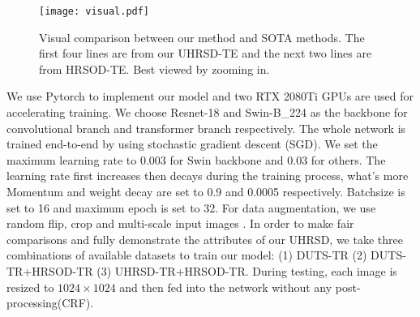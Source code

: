 \documentclass[10pt,twocolumn,letterpaper]{article}
\begin{document}
\begin{figure*}[t]
  \centering
  \texttt{[image: visual.pdf]}
  \caption{Visual comparison between our method and SOTA methods. The first four lines are from our UHRSD-TE and the next two lines are from HRSOD-TE. Best viewed by zooming in.}
  \label{fig:visual comparison}
\end{figure*}


We use Pytorch\cite{paszke2017automatic} to implement our model and two RTX 2080Ti GPUs are used for accelerating training. We choose Resnet-18 \cite{he2016deep} and Swin-B\_224 \cite{liu2021swin} as the backbone for convolutional branch and transformer branch respectively. 
The whole network is trained end-to-end by using stochastic gradient descent (SGD). We set the maximum learning rate to 0.003 for Swin backbone and 0.03 for others. The learning rate first increases then decays during the training process, what's more Momentum and weight decay are set to 0.9 and 0.0005 respectively. Batchsize is set to 16 and maximum epoch is set to 32. For data augmentation, we use random flip, crop and multi-scale input images \cite{tang2021disentangled,qin2019basnet,zhao2019egnet}. In order to make fair comparisons and fully demonstrate the attributes of our UHRSD, we take three combinations of available datasets to train our model: (1) DUTS-TR (2) DUTS-TR+HRSOD-TR (3) UHRSD-TR+HRSOD-TR.
During testing, each image is resized to $1024 \times 1024$ and then fed into the network without any post-processing(\eg CRF\cite{krahenbuhl2011efficient}).


\begin{table}[]
\caption{Comparison of different architectures and compositions.}

\renewcommand\arraystretch{1}
\label{table:ablation1}
\centering
{}
\end{table}
\end{document}
